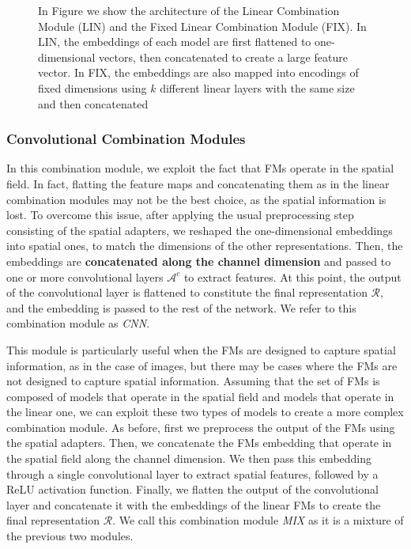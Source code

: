 \begin{figure}[ht]
    \caption{In Figure we show the architecture of the Linear Combination Module (LIN) and the Fixed Linear Combination Module (FIX). In LIN, the embeddings of each model are first flattened to one-dimensional vectors, then concatenated to create a large feature vector. In FIX, the embeddings are also mapped into encodings of fixed dimensions using $k$ different linear layers with the same size and then concatenated}
    \label{fig:lin_combination}
\end{figure}




\subsubsection{Convolutional Combination Modules}
\label{subsubsec:convolutional_combination}
In this combination module, we exploit the fact that FMs operate in the spatial field.
In fact, flatting the feature maps and concatenating them as in the linear combination modules may not be the best choice, as the spatial information is lost.
To overcome this issue, after applying the usual preprocessing step consisting of the spatial adapters, we reshaped the one-dimensional embeddings into spatial ones, to match the dimensions of the other representations.
Then, the embeddings are \textbf{concatenated along the channel dimension} and passed to one or more convolutional layers $\mathcal{A}^c$ to extract features.
At this point, the output of the convolutional layer is flattened to constitute the final representation $\mathcal{R}$, and the embedding is passed to the rest of the network.
We refer to this combination module as \textit{CNN}.

This module is particularly useful when the FMs are designed to capture spatial information, as in the case of images, but there may be cases where the FMs are not designed to capture spatial information.
Assuming that the set of FMs is composed of models that operate in the spatial field and models that operate in the linear one, we can exploit these two types of models to create a more complex combination module.
As before, first we preprocess the output of the FMs using the spatial adapters.
Then, we concatenate the FMs embedding that operate in the spatial field along the channel dimension.
We then pass this embedding through a single convolutional layer to extract spatial features, followed by a ReLU activation function.
Finally, we flatten the output of the convolutional layer and concatenate it with the embeddings of the linear FMs to create the final representation $\mathcal{R}$.
We call this combination module \textit{MIX} as it is a mixture of the previous two modules.

